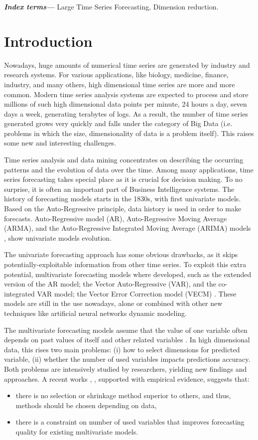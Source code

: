 \documentclass[10pt]{article}
\providecommand{\keywords}[1]{\textbf{\textit{Index terms---}} #1}
\begin{document}
\keywords{Large Time Series Forecasting, Dimension reduction. }

\section{Introduction}
Nowadays, huge amounts of numerical time series are generated by industry and research systems. For various applications, like biology, medicine, finance, industry, and many others, high dimensional time series are more and more common. Modern time series analysis systems are expected to process and store millions of such high dimensional data points per minute, 24 hours a day, seven days a week, generating terabytes of logs. As a result, the number of time series generated grows very quickly and falls under the category of Big Data (i.e. problems in which the size, dimensionality of data is a problem itself). This raises some new and interesting challenges.

Time series analysis and data mining concentrates on describing the occurring patterns and the evolution of data over the time. Among many applications, time series forecasting takes special place as it is crucial for decision making. To no surprise, it is often an important part of Business Intelligence systems. The history of forecasting models starts in the 1830s, with first univariate models. Based on the Auto-Regressive principle, data history is used in order to make forecasts. Auto-Regressive model (AR), Auto-Regressive Moving Average (ARMA), and the Auto-Regressive Integrated Moving Average (ARIMA) models \cite{box1976time}, show univariate models evolution. 

The univariate forecasting approach has some obvious drawbacks, as it skips potentially-exploitable information from other time series. To exploit this extra potential, multivariate forecasting models where developed, such as the extended version of the AR model; the Vector Auto-Regressive (VAR), and the co-integrated VAR model; the Vector Error Correction model (VECM) \cite{johansen1991estimation}. These models are still in the use nowadays, alone or combined with other new techniques like artificial neural networks dynamic modeling.

The multivariate forecasting models assume that the value of one variable often depends on past values of itself and other related variables \cite{johansen1991estimation}. In high dimensional data, this rises two main problems: (i) how to select dimensions for predicted variable, (ii) whether the number of used variables impacts predictions accuracy. Both problems are intensively studied by researchers, yielding new findings and approaches. A recent works  \cite{stock2012generalized}, \cite{jiang2017macroeconomic}, supported with empirical evidence, suggests that:
\begin{itemize}
  \item there is no selection or shrinkage method superior to others, and thus, methods should be chosen depending on data,
  \item there is a constraint on number of used variables that improves forecasting quality for existing multivariate models.
\end{itemize}
\end{document}
